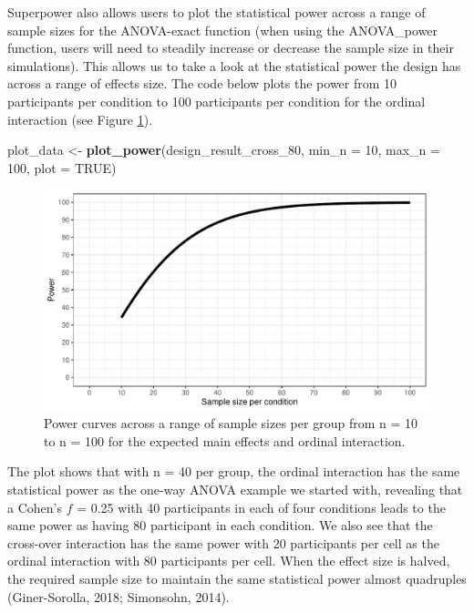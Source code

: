 \documentclass[,man,floatsintext]{apa6}
\newenvironment{Shaded}{\begin{snugshade}}{\end{snugshade}}
\newcommand{\DataTypeTok}[1]{\textcolor[rgb]{0.13,0.29,0.53}{#1}}
\newcommand{\DecValTok}[1]{\textcolor[rgb]{0.00,0.00,0.81}{#1}}
\newcommand{\KeywordTok}[1]{\textcolor[rgb]{0.13,0.29,0.53}{\textbf{#1}}}
\newcommand{\NormalTok}[1]{#1}
\newcommand{\OtherTok}[1]{\textcolor[rgb]{0.56,0.35,0.01}{#1}}
\newcommand{\StringTok}[1]{\textcolor[rgb]{0.31,0.60,0.02}{#1}}
\begin{document}
Superpower also allows users to plot the statistical power across a range of sample sizes for the ANOVA-exact function (when using the ANOVA\_power function, users will need to steadily increase or decrease the sample size in their simulations).
This allows us to take a look at the statistical power the design has across a range of effects size.
The code below plots the power from 10 participants per condition to 100 participants per condition for the ordinal interaction (see Figure \ref{fig:power-plot}).

\begin{Shaded}
\begin{Highlighting}[]
\NormalTok{plot_data <-}\StringTok{ }\KeywordTok{plot_power}\NormalTok{(design_result_cross_}\DecValTok{80}\NormalTok{, }
                        \DataTypeTok{min_n =} \DecValTok{10}\NormalTok{, }\DataTypeTok{max_n =} \DecValTok{100}\NormalTok{, }
                        \DataTypeTok{plot =} \OtherTok{TRUE}\NormalTok{)}
\end{Highlighting}
\end{Shaded}

\begin{figure}
\centering
\includegraphics{0.1_Simulation_Based_Power_Analysis_For_Factorial_ANOVA_Designs_files/figure-latex/power-plot-1.pdf}
\caption{\label{fig:power-plot}Power curves across a range of sample sizes per group from n = 10 to n = 100 for the expected main effects and ordinal interaction.}
\end{figure}

The plot shows that with n = 40 per group, the ordinal interaction has the same statistical power as the one-way ANOVA example we started with, revealing that a Cohen's \(f\) = 0.25 with 40 participants in each of four conditions leads to the same power as having 80 participant in each condition.
We also see that the cross-over interaction has the same power with 20 participants per cell as the ordinal interaction with 80 participants per cell.
When the effect size is halved, the required sample size to maintain the same statistical power almost quadruples (Giner-Sorolla, 2018; Simonsohn, 2014).
\end{document}
